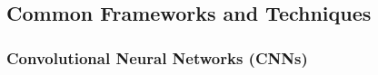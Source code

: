 %
%
%
%
%
%    
%
%
%    
%
%
%
%
%
\subsection{Common Frameworks and Techniques}


\subsubsection{Convolutional Neural Networks (CNNs)\label{ssec:cnn}}


